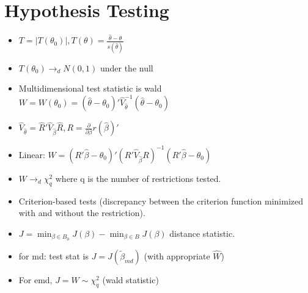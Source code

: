 \documentclass[11pt]{article} %
\begin{document}
\section{Hypothesis Testing}
\begin{itemize}
\item $T = |T(\theta_0)|, T(\theta) = \frac{\hat{\theta} - \theta}{s(\hat{\theta})}$
\item $T(\theta_0) \rightarrow_d N(0,1)$ under the null
\item Multidimensional test statistic is wald $W = W(\theta_0) = (\hat{\theta} - \theta_0)'\hat{V}_{\hat{\theta}}^{-1}(\hat{\theta} - \theta_0)$
\item $\hat{V}_{\hat{\theta}} = \hat{R}'\hat{V}_{\hat{\beta}}\hat{R}, R = \frac{\partial}{\partial \beta}r(\hat{\beta})'$
\item Linear: $W = (R'\hat{\beta} - \theta_0)'(R'\hat{V}_{\hat{\beta}}R)^{-1}(R'\hat{\beta} - \theta_0)$
\item $W\rightarrow_d \chi^2_q$ where q is the number of restrictions tested.
\item Criterion-based tests (discrepancy between the criterion function minimized with and without the restriction).
\item $J = \min_{\beta \in B_0} J(\beta) - \min_{\beta \in B} J(\beta)$ distance statistic.
\item for md: test stat is $J = J(\tilde{\beta}_{md})$ (with appropriate $\hat{W}$)
\item For emd, $J = W \sim \chi_q^2$ (wald statistic) 
\end{itemize}
\end{document}
